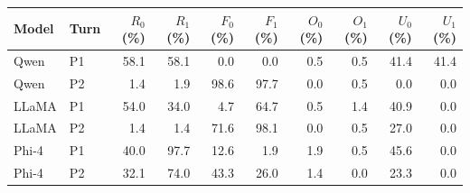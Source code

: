 \begin{tabular}{@{}llrrrrrrrr@{}}
\toprule
Model & Turn & $R_0$ (\%) & $R_1$ (\%) & $F_0$ (\%) & $F_1$ (\%) & $O_0$ (\%) & $O_1$ (\%) & $U_0$ (\%) & $U_1$ (\%) \\
\midrule
Qwen & P1 & 58.1 & 58.1 & 0.0 & 0.0 & 0.5 & 0.5 & 41.4 & 41.4 \\
Qwen & P2 & 1.4 & 1.9 & 98.6 & 97.7 & 0.0 & 0.5 & 0.0 & 0.0 \\
LLaMA & P1 & 54.0 & 34.0 & 4.7 & 64.7 & 0.5 & 1.4 & 40.9 & 0.0 \\
LLaMA & P2 & 1.4 & 1.4 & 71.6 & 98.1 & 0.0 & 0.5 & 27.0 & 0.0 \\
Phi-4 & P1 & 40.0 & 97.7 & 12.6 & 1.9 & 1.9 & 0.5 & 45.6 & 0.0 \\
Phi-4 & P2 & 32.1 & 74.0 & 43.3 & 26.0 & 1.4 & 0.0 & 23.3 & 0.0 \\
\bottomrule
\end{tabular}
